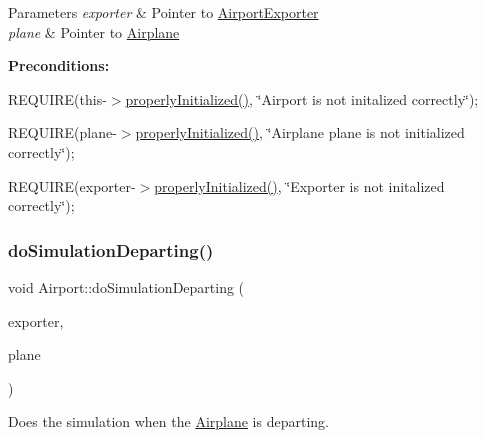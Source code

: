 \begin{DoxyParams}{Parameters}
{\em exporter} & Pointer to \mbox{\hyperlink{class_airport_exporter}{Airport\+Exporter}} \\
\hline
{\em plane} & Pointer to \mbox{\hyperlink{class_airplane}{Airplane}}\\
\hline
\end{DoxyParams}
{\bfseries Preconditions\+:}
\begin{DoxyItemize}
\item R\+E\+Q\+U\+I\+RE(this-\/$>$\mbox{\hyperlink{class_airport_aa13e68ac58e8875837fbe888325cfff6}{properly\+Initialized()}}, \char`\"{}\+Airport is not initalized correctly\char`\"{});
\item R\+E\+Q\+U\+I\+RE(plane-\/$>$\mbox{\hyperlink{class_airport_aa13e68ac58e8875837fbe888325cfff6}{properly\+Initialized()}}, \char`\"{}\+Airplane \textquotesingle{}plane\textquotesingle{} is not initialized correctly\char`\"{});
\item R\+E\+Q\+U\+I\+RE(exporter-\/$>$\mbox{\hyperlink{class_airport_aa13e68ac58e8875837fbe888325cfff6}{properly\+Initialized()}}, \char`\"{}\+Exporter is not initalized correctly\char`\"{}); 
\end{DoxyItemize}\mbox{\label{class_airport_aa218b5ef42ae4d1d61b40377874bd4ca}} 
\subsubsection{\texorpdfstring{do\+Simulation\+Departing()}{doSimulationDeparting()}}
{\footnotesize\ttfamily void Airport\+::do\+Simulation\+Departing (\begin{DoxyParamCaption}\item[{\mbox{\hyperlink{class_airport_exporter}{Airport\+Exporter}} $\ast$}]{exporter,  }\item[{\mbox{\hyperlink{class_airplane}{Airplane}} $\ast$}]{plane }\end{DoxyParamCaption})}



Does the simulation when the \mbox{\hyperlink{class_airplane}{Airplane}} is departing. 


